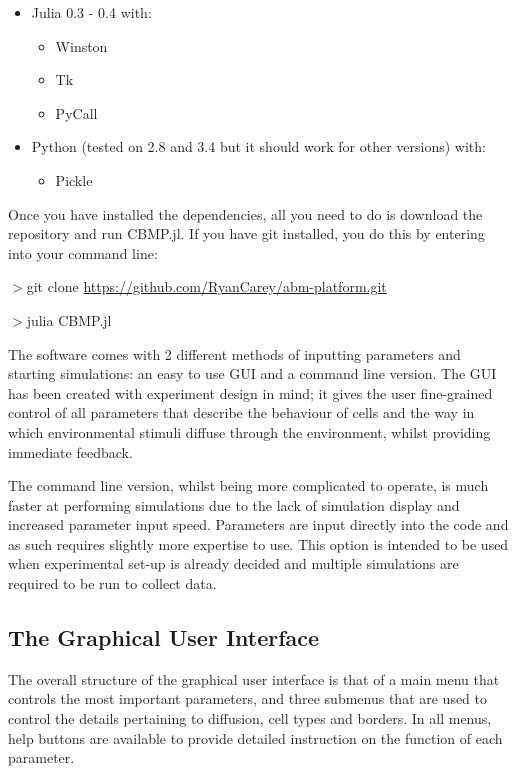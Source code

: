 \documentclass[12pt,a4paper]{report}
\begin{document}
\begin{itemize}
\item Julia 0.3 - 0.4 with:
\begin{itemize}
\item Winston
\item Tk
\item PyCall
\end{itemize}
\item Python (tested on 2.8 and 3.4 but it should work for other 
versions) with:
\begin{itemize}
\item Pickle
\end{itemize}
\end{itemize}


Once you have installed the dependencies, all you need to do is download 
the repository and run CBMP.jl. If you have git installed, you do this 
by entering into your command line:

{\fontsize{09pt}{09pt} \ttfamily
$>$git clone \underline{https://github.com/RyanCarey/abm-platform.git}

$>$julia CBMP.jl}




The software comes with 2 different methods of inputting parameters and 
starting simulations: an easy to use GUI and a command line version. The 
GUI has been created with experiment design in mind; it gives the user 
fine-grained control of all parameters that describe the behaviour of 
cells and the way in which environmental stimuli diffuse through the 
environment, whilst providing immediate feedback.



The command line version, whilst being more complicated to operate, is 
much faster at performing simulations due to the lack of simulation 
display and increased parameter input speed. Parameters are input 
directly into the code and as such requires slightly more expertise to 
use. This option is intended to be used when experimental set-up is 
already decided and multiple simulations are required to be run to 
collect data.



\subsection{The Graphical User Interface}
The overall structure of the graphical user interface is that of a main 
menu that controls the most important parameters, and three submenus 
that are used to control the details pertaining to diffusion, cell types 
and borders. In all menus, help buttons are available to provide 
detailed instruction on the function of each parameter.
\end{document}
